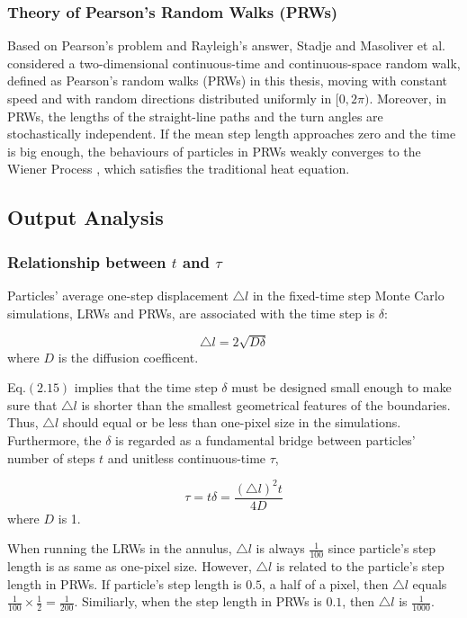 \subsubsection{Theory of Pearson's Random Walks (PRWs)}

Based on Pearson's problem and Rayleigh's answer, Stadje
\cite{stadje1987exact} and Masoliver et al. \cite{masoliver1993some}
considered a two-dimensional continuous-time and continuous-space
random walk, defined as Pearson's random walks (PRWs) in this thesis,
moving with constant speed and with random directions distributed
uniformly in $[0, 2\pi)$. Moreover, in PRWs, the lengths of the
  straight-line paths and the turn angles are stochastically
  independent. If the mean step length approaches zero and the time is
  big enough, the behaviours of particles in PRWs weakly converges to
  the Wiener Process \cite{stadje1987exact}, which satisfies the
  traditional heat equation.
  
  
\subsection{Output Analysis}

\subsubsection{Relationship between $t$ and $\tau$}

Particles' average one-step displacement $\triangle l$ in the
fixed-time step Monte Carlo simulations, LRWs and PRWs, are associated
with the time step is $\delta$:

\begin{equation}
  \triangle l = 2 \sqrt{D \delta}
\end{equation}
where $D$ is the diffusion coefficent.

Eq.$(2.15)$ implies that the time step $\delta$ must be designed small
enough to make sure that $\triangle l$ is shorter than the smallest
geometrical features of the boundaries. Thus, $\triangle l$ should
equal or be less than one-pixel size in the simulations. Furthermore,
the $\delta$ is regarded as a fundamental bridge between particles'
number of steps $t$ and unitless continuous-time $\tau$,

\begin{equation}
 \tau = t \delta = \frac{(\triangle l)^2 t}{4D}
\end{equation}
where $D$ is 1.

When running the LRWs in the annulus, $\triangle l$ is always
$\frac{1}{100}$ since particle's step length is as same as one-pixel
size. However, $\triangle l$ is related to the particle's step length
in PRWs. If particle's step length is $0.5$, a half of a pixel, then
$\triangle l$ equals $\frac{1}{100} \times \frac{1}{2} =
\frac{1}{200}$.  Similiarly, when the step length in PRWs is $0.1$,
then $\triangle l$ is $\frac{1}{1000}$. 


